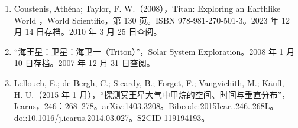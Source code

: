 \begin{enumerate}
\item Coustenis, Athéna; Taylor, F. W.（2008），Titan: Exploring an Earthlike World
，World Scientific，第 130 页。ISBN 978-981-270-501-3。2023 年 12 月 14 日存档。2010 年 3 月 25 日查阅。
\item “海王星：卫星：海卫一（Triton）”，Solar System Exploration。2008 年 1 月 10 日存档。2007 年 12 月 31 日查阅。
\item Lellouch, E.; de Bergh, C.; Sicardy, B.; Forget, F.; Vangvichith, M.; Käufl, H.-U.（2015 年 1 月），“探测冥王星大气中甲烷的空间、时间与垂直分布”，Icarus，246：268–278。arXiv:1403.3208。Bibcode:2015Icar..246..268L。doi:10.1016/j.icarus.2014.03.027。S2CID 119194193。


\end{enumerate}








